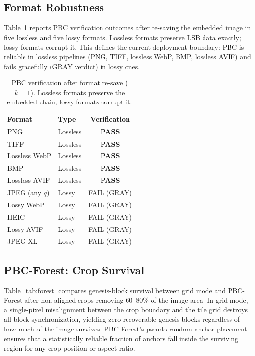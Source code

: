 \documentclass[conference]{IEEEtran}
\begin{document}
\subsection{Format Robustness}

Table~\ref{tab:format} reports PBC verification outcomes after
re-saving the embedded image in five lossless and five lossy formats.
Lossless formats preserve LSB data exactly; lossy formats corrupt it.
This defines the current deployment boundary: PBC is reliable in
lossless pipelines (PNG, TIFF, lossless WebP, BMP, lossless AVIF)
and fails gracefully (GRAY verdict) in lossy ones.

\begin{table}[t]
  \centering
  \caption{PBC verification after format re-save ($k{=}1$). Lossless
    formats preserve the embedded chain; lossy formats corrupt it.}
  \label{tab:format}
  \begin{tabular}{llc}
    \toprule
    Format           & Type     & Verification \\
    \midrule
    PNG              & Lossless & \textbf{PASS} \\
    TIFF             & Lossless & \textbf{PASS} \\
    Lossless WebP    & Lossless & \textbf{PASS} \\
    BMP              & Lossless & \textbf{PASS} \\
    Lossless AVIF    & Lossless & \textbf{PASS} \\
    \midrule
    JPEG (any $q$)   & Lossy    & FAIL (GRAY)  \\
    Lossy WebP       & Lossy    & FAIL (GRAY)  \\
    HEIC             & Lossy    & FAIL (GRAY)  \\
    Lossy AVIF       & Lossy    & FAIL (GRAY)  \\
    JPEG XL          & Lossy    & FAIL (GRAY)  \\
    \bottomrule
  \end{tabular}
\end{table}

\subsection{PBC-Forest: Crop Survival}

Table~\ref{tab:forest} compares genesis-block survival between grid
mode and PBC-Forest after non-aligned crops removing $60$--$80\%$ of
the image area. In grid mode, a single-pixel misalignment between the
crop boundary and the tile grid destroys all block synchronization,
yielding zero recoverable genesis blocks regardless of how much of the
image survives. PBC-Forest's pseudo-random anchor placement ensures
that a statistically reliable fraction of anchors fall inside the
surviving region for any crop position or aspect ratio.
\end{document}
